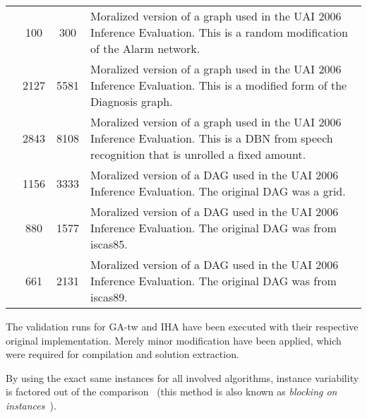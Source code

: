 \documentclass[thesis.tex]{subfiles}
\begin{document}
\begin{table}[htbp]
\begin{tabularx}{\textwidth}{p{5em}S[table-format=4]S[table-format=4]>{\raggedright\arraybackslash}X}
       & 100 & 300 &
      Moralized version of a graph used in the UAI 2006 Inference Evaluation. This is a random modification of the Alarm network.\\[\RowSeparatorLength]

       & 2127 & 5581 &
      Moralized version of a graph used in the UAI 2006 Inference Evaluation. This is a modified form of the Diagnosis graph.\\[\RowSeparatorLength]

       & 2843 & 8108 &
      Moralized version of a graph used in the UAI 2006 Inference Evaluation. This is a DBN from speech recognition that is unrolled a fixed amount.\\[\RowSeparatorLength]

       & 1156 & 3333 &
      Moralized version of a DAG used in the UAI 2006 Inference Evaluation. The original DAG was a grid.\\[\RowSeparatorLength]

       & 880 & 1577 &
      Moralized version of a DAG used in the UAI 2006 Inference Evaluation. The original DAG was from iscas85.\\[\RowSeparatorLength]

       & 661 & 2131 &
      Moralized version of a DAG used in the UAI 2006 Inference Evaluation. The original DAG was from iscas89.\\
   \bottomrule
   \end{tabularx}
\end{table}

The validation runs for \gls{GA-tw} and \gls{IHA} have been executed with their respective original implementation. Merely minor modification have been applied, which were required for compilation and solution extraction.

By using the exact same instances for all involved algorithms, instance variability is factored out of the comparison~\parencite{theoreticians-guide-to-experimental-analysis} (this method is also known as \textit{blocking on instances}~\parencite{experimental-tutorial}).
\end{document}

